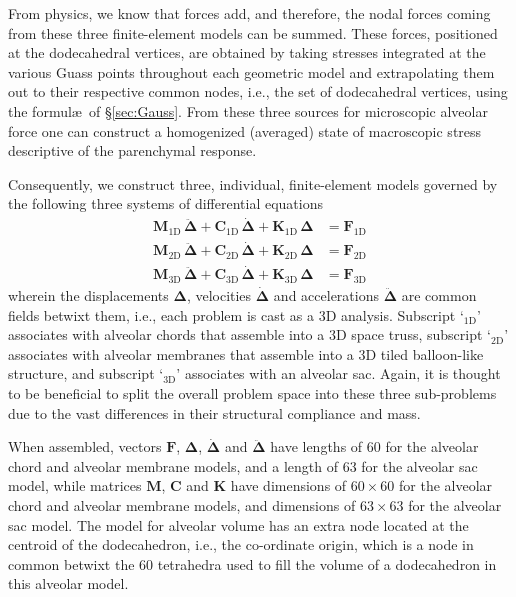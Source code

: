 From physics, we know that forces add, and therefore, the nodal forces coming from these three finite-element models can be summed.  These forces, positioned at the dodecahedral vertices, are obtained by taking stresses integrated at the various Guass points throughout each geometric model and extrapolating them out to their respective common nodes, i.e., the set of dodecahedral vertices, using the formul\ae\ of \S\ref{sec:Gauss}.  From these three sources for micro\-scopic alveolar force one can construct a homo\-genized (averaged) state of macro\-scopic stress descriptive of the parenchymal response.

Consequently, we construct three, individual, finite-element models governed by the following three systems of differential equations
\begin{subequations}
    \label{EofMotion}
	\begin{align}
	\mathbf{M}_{\mathrm{1D}} \, \ddot{\boldsymbol{\Delta}} +
    \mathbf{C}_{\mathrm{1D}} \, \dot{\boldsymbol{\Delta}} + \mathbf{K}_{\mathrm{1D}} \, \boldsymbol{\Delta} & 
	= \boldsymbol{F}_{\mathrm{1D}} \\
	\mathbf{M}_{\mathrm{2D}} \, \ddot{\boldsymbol{\Delta}} +
    \mathbf{C}_{\mathrm{2D}} \, \dot{\boldsymbol{\Delta}} + \mathbf{K}_{\mathrm{2D}} \, \boldsymbol{\Delta} & 
	= \boldsymbol{F}_{\mathrm{2D}} \\
	\mathbf{M}_{\mathrm{3D}} \, \ddot{\boldsymbol{\Delta}} +
    \mathbf{C}_{\mathrm{3D}} \, \dot{\boldsymbol{\Delta}} + \mathbf{K}_{\mathrm{3D}} \, \boldsymbol{\Delta} & 
	= \boldsymbol{F}_{\mathrm{3D}}
	\end{align}
\end{subequations}
wherein the displacements $\boldsymbol{\Delta}$, velocities $\dot{\boldsymbol{\Delta}}$ and accelerations $\ddot{\boldsymbol{\Delta}}$ are common fields betwixt them, i.e., each problem is cast as a 3D analysis.  Subscript `$\mbox{}_{\mathrm{1D}}$' associates with alveolar chords that assemble into a 3D space truss, subscript `$\mbox{}_{\mathrm{2D}}$' associates with alveolar membranes that assemble into a 3D tiled balloon-like structure, and subscript `$\mbox{}_{\mathrm{3D}}$' associates with an alveolar sac.  Again, it is thought to be beneficial to split the overall problem space into these three sub-problems due to the vast differences in their structural compliance and mass.

When assembled, vectors $\boldsymbol{F}$, $\boldsymbol{\Delta}$, $\dot{\boldsymbol{\Delta}}$ and $\ddot{\boldsymbol{\Delta}}$ have lengths of 60 for the alveolar chord and alveolar membrane models, and a length of 63 for the alveolar sac model, while matrices $\mathbf{M}$, $\mathbf{C}$ and $\mathbf{K}$ have dimensions of $60 \! \times \! 60$ for the alveolar chord and alveolar membrane models, and dimensions of $63 \! \times \! 63$ for the alveolar sac model.  The model for alveolar volume has an extra node located at the centroid of the dodecahedron, i.e., the co-ordinate origin, which is a node in common betwixt the 60 tetrahedra used to fill the volume of a dodecahedron in this alveolar model. 

